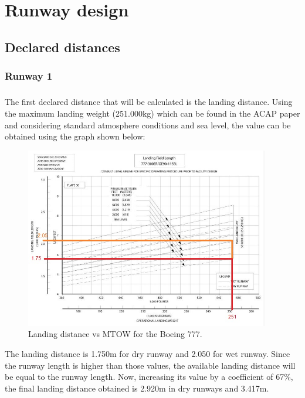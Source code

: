 \chapter{Runway design}

	\section{Declared distances}
		\subsection{Runway 1}
		\paragraph{}The first declared distance that will be calculated is the landing distance. Using the maximum landing weight (251.000kg) which can be found in the ACAP paper and considering standard atmosphere conditions and sea level, the value can be obtained using the graph shown below: 
		
		\begin{figure}[H]
			\centering
			\includegraphics[clip, trim=0cm 0cm 0cm 0cm, width=0.95\textwidth]{./images/B777/landingdistance777}
			\caption{Landing distance vs MTOW for the Boeing 777.} %
			\label{} %
		\end{figure}
		
		The landing distance is 1.750m for dry runway and 2.050 for wet runway. Since the runway length is higher than those values, the available landing distance will be equal to the runway length.	Now, increasing its value by a coefficient of 67\%, the final landing distance obtained is 2.920m in dry runways and 3.417m. 
		
